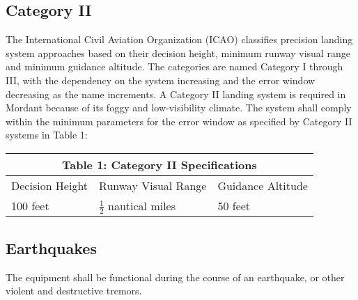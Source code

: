 \documentclass[11pt]{article}
\begin{document}
		\subsection{Category II}
		The International Civil Aviation Organization (ICAO) classifies precision landing system approaches based on their decision height, minimum runway visual range and minimum guidance altitude. The categories are named Category I through III, with the dependency on the system increasing and the error window decreasing as the name increments. A Category II landing system is required in Mordant because of its foggy and low-visibility climate. The system shall comply within the minimum parameters for the error window as specified by Category II systems in Table 1:

		\renewcommand{\arraystretch}{1.5}
		\setlength{\tabcolsep}{18pt}
		\begin{table}[h!]
			\centering
			\begin{tabular}{|p{5cm}|p{5cm}|p{5cm}|}
				 \hline
				 \multicolumn{3}{|c|}{Table 1: Category II Specifications} \\
				 \hline
				 Decision Height & Runway Visual Range & Guidance Altitude\\
				 \hline
				 100 feet & $\frac{1}{2}$ nautical miles & 50 feet\\
				 \hline
			\end{tabular}
		\end{table}

		\subsection{Earthquakes}
		The equipment shall be functional during the course of an earthquake, or other violent and destructive tremors.
\end{document}
